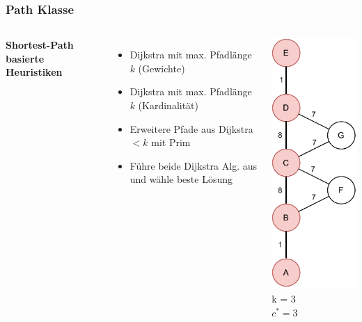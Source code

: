 \documentclass[aspectratio=169]{beamer}
\begin{document}
\begin{frame}
	\frametitle{Path Klasse}
	\begin{columns}[c] %
		
		\textbf{Shortest-Path basierte Heuristiken}
		\begin{itemize}
			\item Dijkstra mit max. Pfadlänge $k$ (Gewichte)
			\item Dijkstra mit max. Pfadlänge $k$ (Kardinalität)
			\item Erweitere Pfade aus Dijkstra $<k$ mit Prim
			\item Führe beide Dijkstra Alg. aus und wähle beste Lösung
		\end{itemize}
		\includegraphics[scale=.5]{path_optimal.pdf}
		k = 3\\
		$c^* = 3$
		
		
	\end{columns}
	\end{frame}
	
\end{document}
